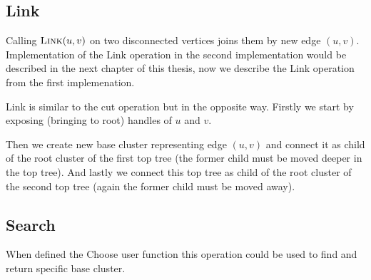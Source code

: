 \subsection{Link}

Calling $\hbox{\sc Link}(u,v)$ on two disconnected vertices joins them by new edge $(u,v)$.
Implementation of the Link operation in the second implementation would be
described in the next chapter of this thesis, now we describe the Link operation
from the first implemenation.

Link is similar to the cut operation but in the opposite way. Firstly we start
by {\I exposing} (bringing to root) handles of $u$ and $v$.

Then we create new base cluster representing edge $(u,v)$ and connect it as
child of the root cluster of the first top tree (the former child must be
moved deeper in the top tree). And lastly we connect this top tree as child of
the root cluster of the second top tree (again the former child must be moved
away).

\subsection{Search}

When defined the {\I Choose} user function this operation could be used to find
and return specific base cluster.

